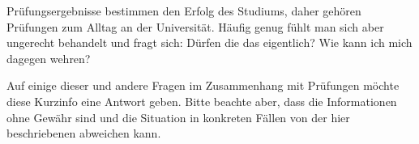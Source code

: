 \begin{artikel}{}
Prüfungsergebnisse bestimmen den Erfolg des Studiums, daher gehören Prüfungen zum Alltag an der Universität. Häufig genug fühlt man sich aber ungerecht behandelt und fragt sich: Dürfen die das eigentlich? Wie kann ich mich dagegen wehren?

Auf einige dieser und andere Fragen im Zusammenhang mit Prüfungen möchte diese Kurzinfo eine Antwort geben. Bitte beachte aber, dass die Informationen ohne Gewähr sind und die Situation in konkreten Fällen von der hier beschriebenen abweichen kann.
\end{artikel}
